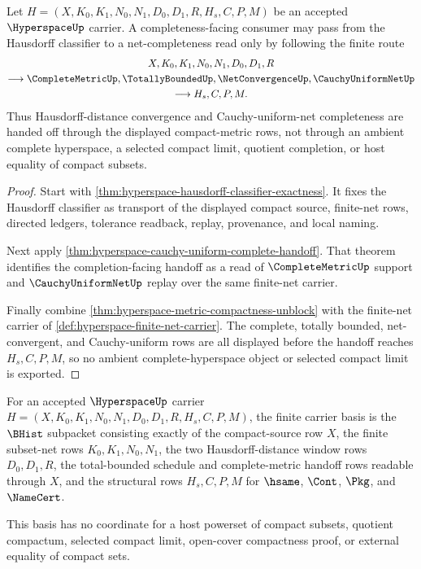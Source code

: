 \begin{theorem}
\label{thm:hyperspace-hausdorff-net-completeness-handoff}
Let $H=(X,K_0,K_1,N_0,N_1,D_0,D_1,R,H_s,C,P,M)$ be an accepted $\HyperspaceUp$ carrier. A completeness-facing consumer may pass from the Hausdorff classifier to a net-completeness read only by following the finite route
$$
\begin{gathered}
X,K_0,K_1,N_0,N_1,D_0,D_1,R\\
\longrightarrow \CompleteMetricUp,\TotallyBoundedUp,\NetConvergenceUp,\CauchyUniformNetUp\\
\longrightarrow H_s,C,P,M.
\end{gathered}
$$
Thus Hausdorff-distance convergence and Cauchy-uniform-net completeness are handed off through the displayed compact-metric rows, not through an ambient complete hyperspace, a selected compact limit, quotient completion, or host equality of compact subsets.
\end{theorem}
\begin{proof}
Start with \autoref{thm:hyperspace-hausdorff-classifier-exactness}. It fixes the Hausdorff classifier as transport of the displayed compact source, finite-net rows, directed ledgers, tolerance readback, replay, provenance, and local naming.

Next apply \autoref{thm:hyperspace-cauchy-uniform-complete-handoff}. That theorem identifies the completion-facing handoff as a read of $\CompleteMetricUp$ support and $\CauchyUniformNetUp$ replay over the same finite-net carrier.

Finally combine \autoref{thm:hyperspace-metric-compactness-unblock} with the finite-net carrier of \autoref{def:hyperspace-finite-net-carrier}. The complete, totally bounded, net-convergent, and Cauchy-uniform rows are all displayed before the handoff reaches $H_s,C,P,M$, so no ambient complete-hyperspace object or selected compact limit is exported.
\end{proof}

\begin{definition}
\label{def:hyperspace-finite-carrier}
For an accepted $\HyperspaceUp$ carrier $H=(X,K_0,K_1,N_0,N_1,D_0,D_1,R,H_s,C,P,M)$, the finite carrier basis is the $\BHist$ subpacket consisting exactly of the compact-source row $X$, the finite subset-net rows $K_0,K_1,N_0,N_1$, the two Hausdorff-distance window rows $D_0,D_1,R$, the total-bounded schedule and complete-metric handoff rows readable through $X$, and the structural rows $H_s,C,P,M$ for $\hsame$, $\Cont$, $\Pkg$, and $\NameCert$.

This basis has no coordinate for a host powerset of compact subsets, quotient compactum, selected compact limit, open-cover compactness proof, or external equality of compact sets.
\end{definition}

